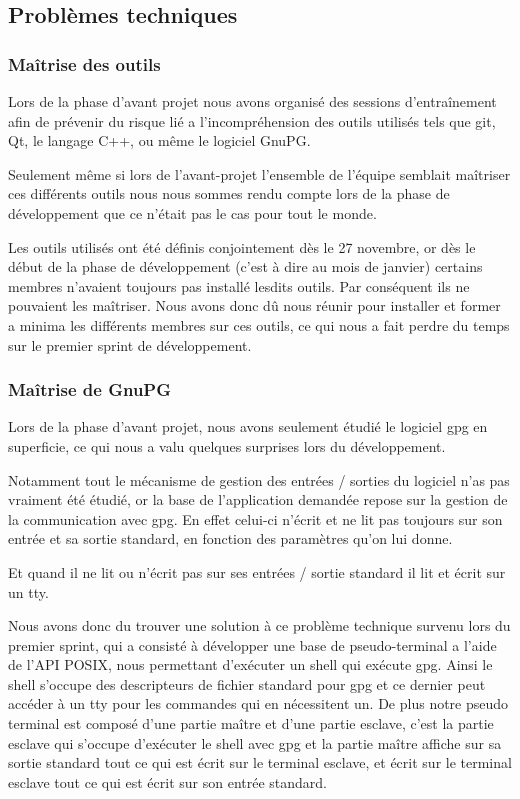 \documentclass{../res/univ-projet}
\begin{document}
    
  \subsection{Problèmes techniques}

    \subsubsection{Maîtrise des outils}

      Lors de la phase d'avant projet nous avons organisé des sessions d’entraînement afin
      de prévenir du risque lié a l’incompréhension des outils utilisés tels que git, Qt, le langage C++,
      ou même le logiciel GnuPG.

      Seulement même si lors de l'avant-projet l'ensemble de l'équipe semblait maîtriser ces
      différents outils nous nous sommes rendu compte lors de la phase de développement que ce n'était pas le cas
      pour tout le monde.

      Les outils utilisés ont été définis conjointement dès le 27 novembre, or dès le début de la phase de développement
      (c'est à dire au mois de janvier) certains membres n'avaient toujours pas installé lesdits outils. Par conséquent
      ils ne pouvaient les maîtriser. Nous avons donc dû nous réunir pour installer et former a minima les différents membres
      sur ces outils, ce qui nous a fait perdre du temps sur le premier sprint de développement.

    \subsubsection{Maîtrise de GnuPG}
    
      Lors de la phase d'avant projet, nous avons seulement étudié le logiciel gpg
      en superficie, ce qui nous a valu quelques surprises lors du développement.

      Notamment tout le mécanisme de gestion des entrées / sorties du logiciel n'as pas vraiment été
      étudié, or la base de l'application demandée repose sur la gestion de la communication avec
      gpg.
      En effet celui-ci n'écrit et ne lit pas toujours sur son entrée et sa sortie standard,
      en fonction des paramètres qu'on lui donne.

      Et quand il ne lit ou n'écrit pas sur ses entrées / sortie standard il lit et écrit sur un
      tty.

      Nous avons donc du trouver une solution à ce problème technique survenu lors du premier sprint,
      qui a consisté à développer une base de pseudo-terminal a l'aide de l'API POSIX, nous permettant
      d'exécuter un shell qui exécute gpg.
      Ainsi le shell s'occupe des descripteurs de fichier standard pour gpg et ce dernier peut accéder à un tty
      pour les commandes qui en nécessitent un.
      De plus notre pseudo terminal est composé d'une partie maître et d'une partie esclave,
      c'est la partie esclave qui s'occupe d'exécuter le shell avec gpg et la partie maître affiche
      sur sa sortie standard tout ce qui est écrit sur le terminal esclave, 
      et écrit sur le terminal esclave tout ce qui est écrit sur son entrée standard.
\end{document}
